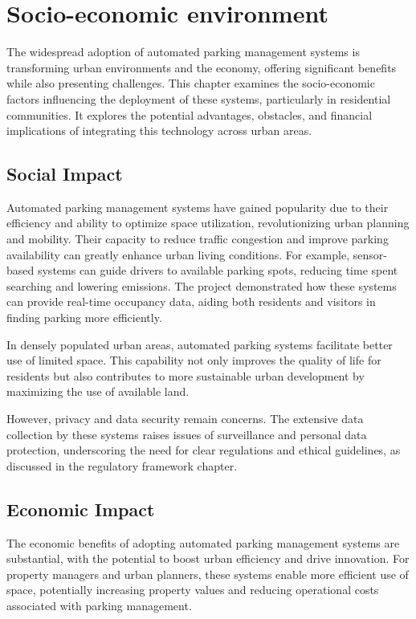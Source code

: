 \chapter{Socio-economic environment}\label{ch:socio_economic_environment}

The widespread adoption of automated parking management systems is transforming urban environments and the economy, offering significant benefits while also presenting challenges. This chapter examines the socio-economic factors influencing the deployment of these systems, particularly in residential communities. It explores the potential advantages, obstacles, and financial implications of integrating this technology across urban areas.

\section{Social Impact}

Automated parking management systems have gained popularity due to their efficiency and ability to optimize space utilization, revolutionizing urban planning and mobility. Their capacity to reduce traffic congestion and improve parking availability can greatly enhance urban living conditions. For example, sensor-based systems can guide drivers to available parking spots, reducing time spent searching and lowering emissions. The project demonstrated how these systems can provide real-time occupancy data, aiding both residents and visitors in finding parking more efficiently.

In densely populated urban areas, automated parking systems facilitate better use of limited space. This capability not only improves the quality of life for residents but also contributes to more sustainable urban development by maximizing the use of available land.

However, privacy and data security remain concerns. The extensive data collection by these systems raises issues of surveillance and personal data protection, underscoring the need for clear regulations and ethical guidelines, as discussed in the regulatory framework chapter.

\section{Economic Impact}

The economic benefits of adopting automated parking management systems are substantial, with the potential to boost urban efficiency and drive innovation. For property managers and urban planners, these systems enable more efficient use of space, potentially increasing property values and reducing operational costs associated with parking management.

